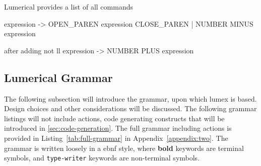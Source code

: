 Lumerical provides a list of all commands~\cite{ansys_lsf_commands}


 expression -> OPEN\_PAREN expression CLOSE\_PAREN
            |  NUMBER MINUS expression

after adding not ll
 expression -> NUMBER PLUS expression





\subsection{Lumerical Grammar}
The following subsection will introduce the grammar, upon which \gls{lumex} is based. Design choices and other considerations will be discussed. The following grammar listings will not include actions, code generating constructs that will be introduced in \cref{sec:code-generation}. The full grammar including actions is provided in Listing~\ref{tab:full-grammar} in Appendix~\ref{appendix:two}. The grammar is written loosely in a \gls{ebnf} style, where \textbf{bold} keywords are terminal symbols, and \texttt{type-writer} keywords are non-terminal symbols. 


